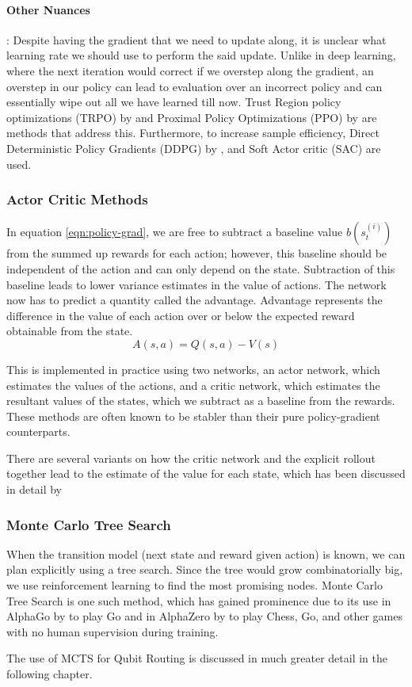 \paragraph{Other Nuances}: Despite having the gradient that we need to update along, it is unclear what learning rate we should use to perform the said update. Unlike in deep learning, where the next iteration would correct if we overstep along the gradient, an overstep in our policy can lead to evaluation over an incorrect policy and can essentially wipe out all we have learned till now. Trust Region policy optimizations (TRPO) by \cite{trpo} and Proximal Policy Optimizations (PPO) by \cite{ppo} are methods that address this. Furthermore, to increase sample efficiency, Direct Deterministic Policy Gradients (DDPG) by \cite{ddpg}, and Soft Actor critic (SAC) \cite{sac} are used.

\subsubsection{Actor Critic Methods}

In equation \ref{eqn:policy-grad}, we are free to subtract a baseline value $b(s_t^{(i)})$ from the summed up rewards for each action; however, this baseline should be independent of the action and can only depend on the state. Subtraction of this baseline leads to lower variance estimates in the value of actions. The network now has to predict a quantity called the advantage. Advantage represents the difference in the value of each action over or below the expected reward obtainable from the state.
\begin{equation}\label{eqn:advantage}
    A(s, a) = Q(s, a) - V(s)
\end{equation}

This is implemented in practice using two networks, an actor network, which estimates the values of the actions, and a critic network, which estimates the resultant values of the states, which we subtract as a baseline from the rewards. These methods are often known to be stabler than their pure policy-gradient counterparts.

There are several variants on how the critic network and the explicit rollout together lead to the estimate of the value for each state, which has been discussed in detail by \cite{actor-critic-a2c, actor-critic-a3c, actor-critic-gae}

\subsubsection{Monte Carlo Tree Search}

When the transition model (next state and reward given action) is known, we can plan explicitly using a tree search. Since the tree would grow combinatorially big, we use reinforcement learning to find the most promising nodes. Monte Carlo Tree Search is one such method, which has gained prominence due to its use in AlphaGo by \cite{mcts-alphago} to play Go and in AlphaZero by \cite{mcts-alphazero} to play Chess, Go, and other games with no human supervision during training. 

The use of MCTS for Qubit Routing is discussed in much greater detail in the following chapter.